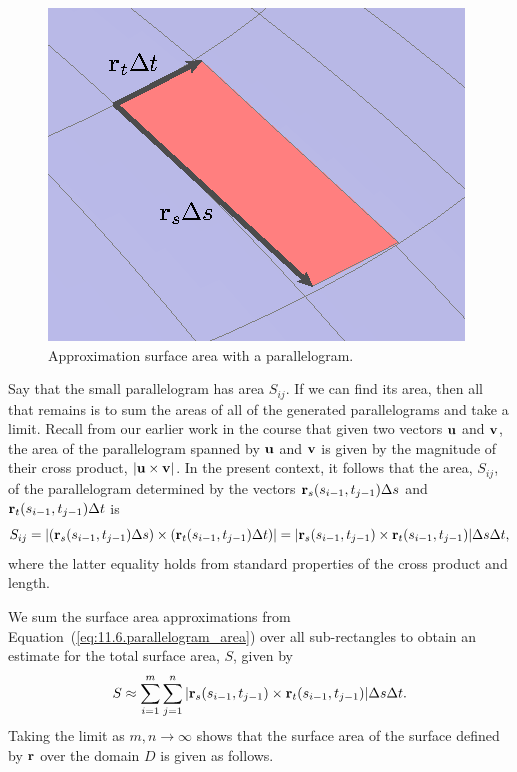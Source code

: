 \begin{figure}[ht]
  \begin{center}
    \includegraphics{figures/fig_11_6_approx.eps}
  \end{center}
  \caption{Approximation surface area with a parallelogram.}
  \label{F:11.6.approx}
\end{figure}

Say that the small parallelogram has area $S_{ij}$.  If we can find its area, then all that remains is to sum the areas of all of the generated parallelograms and take a limit.  Recall from our earlier work in the course that given two vectors $\mathbf{u}$ and $\mathbf{v}$, the area of the parallelogram spanned by $\mathbf{u}$ and $\mathbf{v}$ is given by the magnitude of their cross product, $| \mathbf{u} \times \mathbf{v}|$.  In the present context, it follows that the area, $S_{ij}$, of the parallelogram determined by the vectors $\mathbf{r}_s(s_{i-1},t_{j-1}) \Delta s$ and $\mathbf{r}_t(s_{i-1},t_{j-1}) \Delta t$ is
\begin{equation} \label{eq:11.6.parallelogram_area}
S_{ij} = |(\mathbf{r}_s(s_{i-1},t_{j-1}) \Delta s) \times (\mathbf{r}_t(s_{i-1},t_{j-1}) \Delta t)| = |\mathbf{r}_s(s_{i-1},t_{j-1}) \times \mathbf{r}_t(s_{i-1},t_{j-1})| \Delta s \Delta t,
\end{equation}
where the latter equality holds from standard properties of the cross product and length.

%

We sum the surface area approximations from Equation~(\ref{eq:11.6.parallelogram_area}) over all sub-rectangles to obtain an estimate for the total surface area, $S$, given by 
\[S \approx \sum_{i=1}^m \sum_{j=1}^n |\mathbf{r}_s(s_{i-1},t_{j-1}) \times \mathbf{r}_t(s_{i-1},t_{j-1})| \Delta s \Delta t.\] 
Taking the limit as $m, n \to \infty$ shows that the surface area of the surface defined by $\mathbf{r}$ over the domain $D$ is given as follows.

